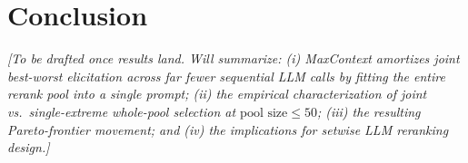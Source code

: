 \section{Conclusion}
\label{sec:conclusion}

\textit{[To be drafted once results land. Will summarize: (i) MaxContext
amortizes joint best-worst elicitation across far fewer sequential LLM calls by
fitting the entire rerank pool into a single prompt; (ii) the empirical
characterization of joint vs.\ single-extreme whole-pool selection at
$\text{pool size}\le 50$; (iii) the resulting Pareto-frontier movement; and
(iv) the implications for setwise LLM reranking design.]}
